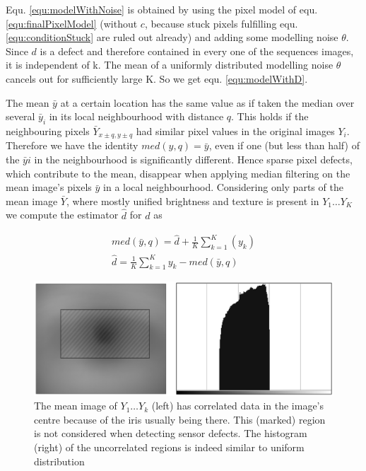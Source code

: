 \documentclass[10pt,twocolumn,letterpaper]{article}
\begin{document}
Equ. \ref{equ:modelWithNoise} is obtained by using the pixel model of equ. \ref{equ:finalPixelModel} (without $c$, because stuck pixels fulfilling equ. \ref{equ:conditionStuck} are ruled out already) and adding some modelling noise $\theta$. Since $d$ is a defect and therefore contained in every one of the sequences images, it is independent of k. The mean of a uniformly distributed modelling noise $\theta$ cancels out for sufficiently large K. So we get equ. \ref{equ:modelWithD}.

The mean $\bar{y}$ at a certain location has the same value as if taken the median over several $\bar{y}_i$ in its local neighbourhood with distance $q$. This holds if the neighbouring pixels $\bar{Y}_{{x \pm q, y \pm q}}$ had similar pixel values in the original images $Y_i$. Therefore we have the identity $med(y,q) = \bar{y}$, even if one (but less than half) of the $\bar{y}i$ in the neighbourhood is significantly different. Hence sparse pixel defects, which contribute to the mean, disappear when applying median filtering on the mean image's pixels $\bar{y}$ in a local neighbourhood. Considering only parts of the mean image $\bar{Y}$, where mostly unified brightness and texture is present in $Y_1 \dots Y_K$ we compute the estimator $\hat{d}$ for $d$ as

\begin{eqnarray}
med(\bar{y},q) = \hat{d}+\frac{1}{K}\sum\limits_{k=1}^{K}(y_k) \\
\hat{d} = \frac{1}{K}\sum\limits_{k=1}^{K}y_k - med(\bar{y},q) \label{equ:d}
\end{eqnarray}


\begin{figure}
  \centering
  \includegraphics[width=\linewidth]{img/correlated.png}
  \caption{The mean image of $Y_1 \dots Y_k$ (left) has correlated data in the image's centre because of the iris usually being there. This (marked) region is not considered when detecting sensor defects. The histogram (right) of the uncorrelated regions is indeed similar to uniform distribution}
  \label{fig:correlated}
\end{figure}
\end{document}
